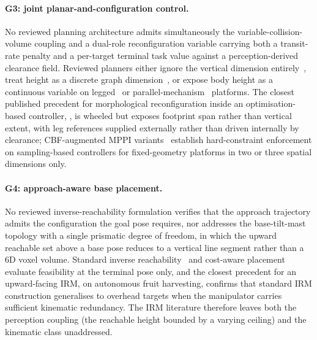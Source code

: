 \documentclass[11pt,a4paper]{article}
\begin{document}
\paragraph{G3: joint planar-and-configuration control.}
No reviewed planning architecture admits simultaneously the variable-collision-volume coupling and a dual-role reconfiguration variable carrying both a transit-rate penalty and a per-target terminal task value against a perception-derived clearance field. Reviewed planners either ignore the vertical dimension entirely~\citep{macenski2020nav2}, treat height as a discrete graph dimension~\citep{bockmannUgv_nav4dAdvancedMultiSurface2024,yangEfficientGlobalNavigational2024,liAutonomousNavigationUnderactuated2023}, or expose body height as a continuous variable on legged~\citep{grandiaPerceptiveLocomotionNonlinear2022,mikiLearningWalkConfined2024} or parallel-mechanism~\citep{DeformableConfigurationPlanning} platforms. The closest published precedent for morphological reconfiguration inside an optimisation-based controller, \citet{pankertDesignMotionPlanning2022}, is wheeled but exposes footprint span rather than vertical extent, with leg references supplied externally rather than driven internally by clearance; CBF-augmented MPPI variants~\citep{yin2023shieldmppi,so2025nsmppi,parwana2025brmppi,knoedler2025rpcbf} establish hard-constraint enforcement on sampling-based controllers for fixed-geometry platforms in two or three spatial dimensions only.

\paragraph{G4: approach-aware base placement.}
No reviewed inverse-reachability formulation verifies that the approach trajectory admits the configuration the goal pose requires, nor addresses the base-tilt-mast topology with a single prismatic degree of freedom, in which the upward reachable set above a base pose reduces to a vertical line segment rather than a 6D voxel volume. Standard inverse reachability~\citep{RobotPlacementBased,makhalReuleauxRobotBase2017,rudorferRM4DCombinedReachability2024} and cost-aware placement~\citep{reisterCombiningNavigationManipulation2022,nguyenTaskSpaceClusteringMobile2023} evaluate feasibility at the terminal pose only, and the closest precedent for an upward-facing IRM, \citet{qiu2025fruitirm} on autonomous fruit harvesting, confirms that standard IRM construction generalises to overhead targets when the manipulator carries sufficient kinematic redundancy. The IRM literature therefore leaves both the perception coupling (the reachable height bounded by a varying ceiling) and the kinematic class unaddressed.
\end{document}
